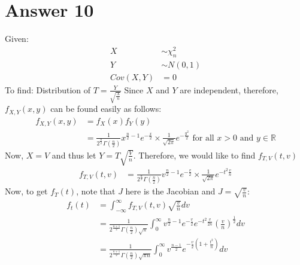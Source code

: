 \documentclass[a4paper]{article}
\begin{document}
\section{Answer 10}
Given:
 \begin{equation*}
	\begin{split}
		X&\sim\chi^2_n\\
		Y&\sim N\left( 0,1 \right)\\
		Cov\left( X,Y \right) &= 0
	\end{split}
\end{equation*}
To find: Distribution of $T = \frac{Y}{\sqrt{\frac{X}{n}}}$ 
\newline\newline
Since $X$ and $Y$ are independent, therefore, $f_{X,Y} \left( x,y \right)$ can be found easily as follows:
\begin{equation*}
	\begin{split}
		f_{X,Y} \left( x,y \right) &= f_X\left( x \right) f_Y\left( y\right)\\
		&= \frac{1}{2^{\frac{n}{2}}\Gamma\left( \frac{n}{2} \right) } x^{\frac{n}{2}-1}e^{-\frac{x}{2}} \times \frac{1}{\sqrt{2\pi} }e^{-\frac{y^2}{2}} \text{ for all $x>0$ and $y \in  \mathbb{R}$}
	\end{split}
\end{equation*}
Now, $X = V$ and thus let $Y = T\sqrt{\frac{V}{n}} $. Therefore, we would like to find  $f_{T,V}\left( t,v \right) $ 
\begin{equation*}
	\begin{split}
		f_{T,V}\left( t,v \right) &= \frac{1}{2^{\frac{n}{2}}\Gamma\left( \frac{n}{2} \right) } v^{\frac{n}{2}-1}e^{-\frac{v}{2}} \times \frac{1}{\sqrt{2\pi} } e^{-t^2 \frac{v}{n}} 
	\end{split}
\end{equation*}
Now, to get $f_T\left( t \right) $, note that $J$ here is the Jacobian and $J = \sqrt{\frac{v}{n}} $:
\begin{equation*}
	\begin{split}
		f_t\left( t \right) &= \int_{-\infty}^{\infty} f_{T,V}\left( t,v \right) \sqrt{\frac{v}{n}}  dv\\
		&= \frac{1}{2^{\frac{n+1}{2}}\Gamma\left( \frac{n}{2} \right) \sqrt{\pi} }\int_{0}^{\infty} v^{\frac{n}{2}-1} e^{-\frac{v}{2}} e^{-t^2 \frac{v}{2n}}\left( \frac{v}{n} \right) ^{\frac{1}{2}}dv\\
		&= \frac{1}{2^{\frac{n+1}{2}}\Gamma\left( \frac{n}{2} \right) \sqrt{\pi n} } \int_{0}^{\infty} v^{\frac{n-1}{2}} e^{-\frac{v}{2}\left( 1+\frac{t^2}{n} \right) }dv\\
	\end{split}
\end{equation*}
\end{document}
